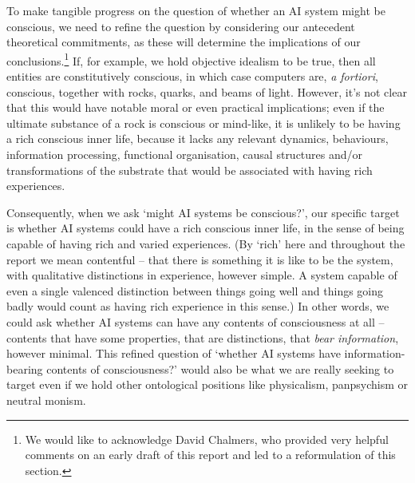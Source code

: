 \documentclass[11pt, a4paper, onecolumn, gdm]{google}
\begin{document}
To make tangible progress on the question of whether an AI system might be conscious, we need to refine the question by considering our antecedent theoretical commitments, as these will determine the implications of our conclusions.\footnote{We would like to acknowledge David Chalmers, who provided very helpful comments on an early draft of this report and led to a reformulation of this section.} If, for example, we hold objective idealism to be true, then all entities are constitutively conscious, in which case computers are, \emph{a fortiori}, conscious, together with rocks, quarks, and beams of light.
However, it's not clear that this would have notable moral or even practical implications; even if the ultimate substance of a rock is conscious or mind-like, it is unlikely to be having a rich conscious inner life, because it lacks any relevant dynamics, behaviours, information processing, functional organisation, causal structures and/or transformations of the substrate that would be associated with having rich experiences.

Consequently, when we ask `might AI systems be conscious?', our specific target is whether AI systems could have a rich conscious inner life, in the sense of being capable of having rich and varied experiences.
(By `rich' here and throughout the report we mean contentful -- that there is something it is like to be the system, with qualitative distinctions in experience, however simple.
A system capable of even a single valenced distinction between things going well and things going badly would count as having rich experience in this sense.) In other words, we could ask whether AI systems can have any contents of consciousness at all -- contents that have some properties, that are distinctions, that \emph{bear information}, however minimal.
This refined question of `whether AI systems have information-bearing contents of consciousness?' would also be what we are really seeking to target even if we hold other ontological positions like physicalism, panpsychism or neutral monism.
\end{document}
